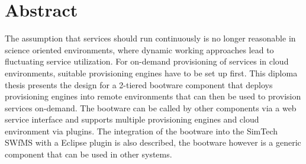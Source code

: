 \chapter*{Abstract}

The assumption that services should run continuously is no longer reasonable in science oriented environments, where dynamic working approaches lead to fluctuating service utilization.
For on-demand provisioning of services in cloud environments, suitable provisioning engines have to be set up first.
This diploma thesis presents the design for a 2-tiered bootware component that deploys provisioning engines into remote environments that can then be used to provision services on-demand.
The bootware can be called by other components via a web service interface and supports multiple provisioning engines and cloud environment via plugins.
The integration of the bootware into the SimTech SWfMS with a Eclipse plugin is also described, the bootware however is a generic component that can be used in other systems.
